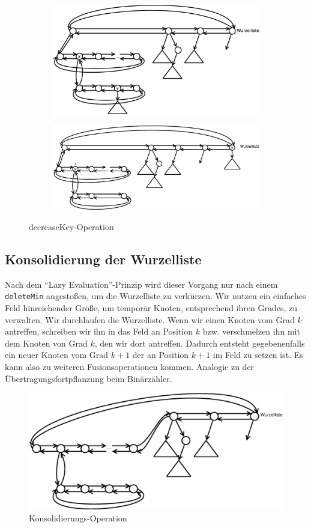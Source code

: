 \begin{figure}[H]
\centering
\begin{subfigure}[h]{0.45\linewidth}
	\includegraphics[width=\linewidth]{21/Grafik/decreaseKey1}
\end{subfigure}
\begin{subfigure}[h]{0.45\linewidth}
	\includegraphics[width=\linewidth]{21/Grafik/decreaseKey2}
\end{subfigure}
\caption{decreaseKey-Operation}
\end{figure}

\subsection{Konsolidierung der Wurzelliste}
Nach dem "`Lazy Evaluation"'-Prinzip wird dieser Vorgang nur nach einem \texttt{deleteMin} angestoßen, um die Wurzelliste zu verkürzen. Wir nutzen ein einfaches Feld hinreichender Größe, um temporär Knoten, entsprechend ihren Grades, zu verwalten. Wir durchlaufen die Wurzelliste. Wenn wir einen Knoten vom Grad $k$ antreffen, schreiben wir ihn in das Feld an Position $k$ bzw. verschmelzen ihn mit dem Knoten von Grad $k$, den wir dort antreffen. Dadurch entsteht gegebenenfalls ein neuer Knoten vom Grad $k+1$ der an Position $k+1$ im Feld zu setzen ist. Es kann also zu weiteren Fusionsoperationen kommen. Analogie zu der Übertragungsfortpflanzung beim Binärzähler.

\begin{figure}[H]
	\centering
	\includegraphics[width=0.65\linewidth]{21/Grafik/insert}
	\caption{Konsolidierungs-Operation}
\end{figure}

